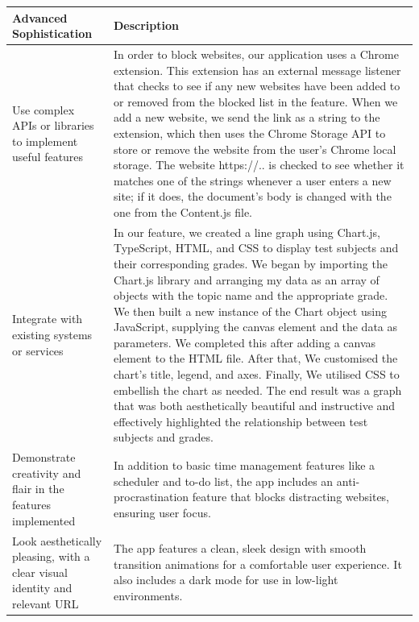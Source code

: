 \documentclass[a4paper]{article}
\begin{document}
\newpage
{\noindent\begin{tabular}{|p{0.25\linewidth}|p{0.75\linewidth}|}
\hline
\textbf{Advanced Sophistication} & \textbf{Description} \\
\hline
Use complex APIs or libraries to implement useful features & In order to block websites, our application uses a Chrome extension. This extension has an external message listener that checks to see if any new websites have been added to or removed from the blocked list in the feature. When we add a new website, we send the link as a string to the extension, which then uses the Chrome Storage API to store or remove the website from the user's Chrome local storage.
The website https://.. is checked to see whether it matches one of the strings whenever a user enters a new site; if it does, the document's body is changed with the one from the Content.js file. \\
\hline
Integrate with existing systems or services & In our feature, we created a line graph using Chart.js, TypeScript, HTML, and CSS to display test subjects and their corresponding grades. We began by importing the Chart.js library and arranging my data as an array of objects with the topic name and the appropriate grade. We then built a new instance of the Chart object using JavaScript, supplying the canvas element and the data as parameters. We completed this after adding a canvas element to the HTML file. After that, We customised the chart's title, legend, and axes. Finally, We utilised CSS to embellish the chart as needed. The end result was a graph that was both aesthetically beautiful and instructive and effectively highlighted the relationship between test subjects and grades. \\
\hline
% 
Demonstrate creativity and flair in the features implemented & In addition to basic time management features like a scheduler and to-do list, the app includes an anti-procrastination feature that blocks distracting websites, ensuring user focus. \\
\hline
Look aesthetically pleasing, with a clear visual identity and relevant URL & The app features a clean, sleek design with smooth transition animations for a comfortable user experience. It also includes a dark mode for use in low-light environments. \\
\hline
\end{tabular}}
\end{document}
